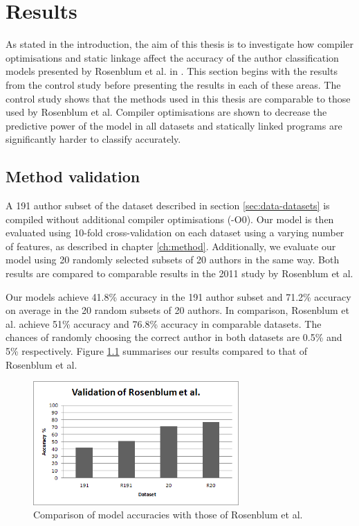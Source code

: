 \documentclass[a4paper,11pt]{kth-mag}
\begin{document}
\chapter{Results}
\label{ch:results}
As stated in the introduction, the aim of this thesis is to investigate how
compiler optimisations and static linkage affect the accuracy of the author
classification models presented by Rosenblum et al. in
\parencite{rosenblum2011wrote}. This section begins with the results from the
control study before presenting the results in each of these areas. The control
study shows that the methods used in this thesis are comparable to those used
by Rosenblum et al. Compiler optimisations are shown to decrease the predictive
power of the model in all datasets and statically linked programs are
significantly harder to classify accurately.

\section{Method validation}
\label{sec:method-validation}
A 191 author subset of the dataset described in section \ref{sec:data-datasets} is
compiled without additional compiler optimisations (-O0). Our model is then
evaluated using 10-fold cross-validation on each dataset using a varying number
of features, as described in chapter \ref{ch:method}. Additionally, we evaluate
our model using 20 randomly selected subsets of 20 authors in the same way.
Both results are compared to comparable results in the 2011 study by Rosenblum
et al.

Our models achieve 41.8\% accuracy in the 191 author subset and 71.2\% accuracy
on average in the 20 random subsets of 20 authors. In comparison, Rosenblum et
al. achieve 51\% accuracy and 76.8\% accuracy in comparable datasets. The
chances of randomly choosing the correct author in both datasets are 0.5\% and
5\% respectively. Figure \ref{fig:rosenblumvalidation} summarises our results
compared to that of Rosenblum et al.

\begin{figure}[!htb]
    \centering
    \includegraphics[width=0.7\textwidth]{rosenblumvalidation}
    \caption{Comparison of model accuracies with those of Rosenblum et al.}
    \label{fig:rosenblumvalidation}
\end{figure}
\end{document}
